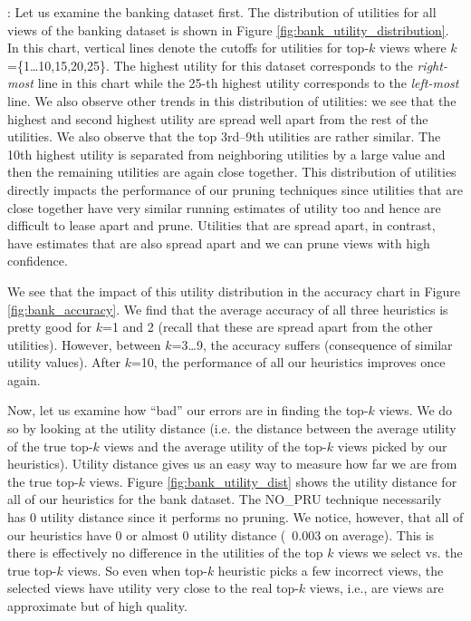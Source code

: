 :
Let us examine the banking dataset first.
The distribution of utilities for all views of the banking dataset is
shown in Figure \ref{fig:bank_utility_distribution}. 
In this chart, vertical lines denote the cutoffs for utilities for top-$k$ views
where $k$=\{1\ldots10,15,20,25\}.
The highest utility for this dataset corresponds to the {\it right-most} line
in this chart while the 25-th highest utility corresponds to the {\it left-most}
line.
We also observe other trends in this distribution of utilities: we see that the
highest and second highest utility are spread well apart from the rest of the
utilities.
We also observe that the top 3rd--9th utilities are rather similar. 
The 10th highest utility is separated from neighboring utilities by a large
value and then the remaining utilities are again close together.
This distribution of utilities directly impacts the performance of our pruning
techniques since utilities that are close together have very similar running
estimates of utility too and hence are difficult to lease apart and prune.
Utilities that are spread apart, in contrast, have estimates that are also
spread apart and we can prune views with high confidence.

We see that the impact of this utility distribution in the accuracy chart in
Figure \ref{fig:bank_accuracy}.
We find that the average accuracy of all three heuristics is pretty good for
$k$=1 and 2 (recall that these are spread apart from the other utilities).
However, between $k$=3\ldots9, the accuracy suffers (consequence of similar
utility values).
After $k$=10, the performance of all our heuristics improves once again.

Now, let us examine how ``bad'' our errors are in finding the top-$k$ views.
We do so by looking at the utility distance (i.e. the distance between
the average utility of the true top-$k$ views and the average utility of the
top-$k$ views picked by our heuristics).
Utility distance gives us an easy way to measure how far we are from the true
top-$k$ views.
Figure \ref{fig:bank_utility_dist} shows the utility distance for
all of our heuristics for the bank dataset.
The NO\_PRU technique necessarily has 0 utility distance since it performs no
pruning.
We notice, however, that all of our heuristics have 0 or almost 0 utility
distance (~0.003 on average).
This is there is effectively no difference in the utilities of the top $k$ views
we select vs. the true top-$k$ views.
So even when top-$k$ heuristic picks a few incorrect views, the selected views
have utility very close to the real top-$k$ views, i.e., are views are
approximate but of high quality.

